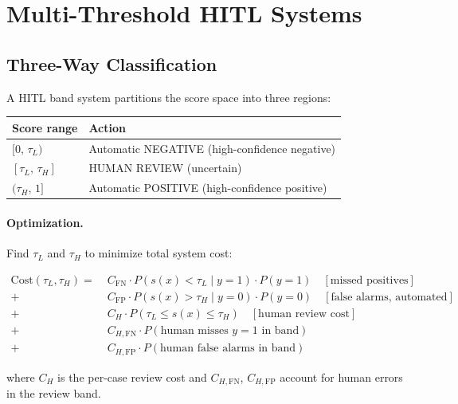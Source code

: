 \section{Multi-Threshold HITL Systems}

\subsection{Three-Way Classification}
\label{sec:three-way-classification}

A HITL band system partitions the score space into three regions:

\begin{center}
\begin{tabular}{@{}ll@{}}
\toprule
\textbf{Score range} & \textbf{Action} \\
\midrule
$[0,\, \tau_L)$ & Automatic NEGATIVE (high-confidence negative) \\
$[\tau_L,\, \tau_H]$ & HUMAN REVIEW (uncertain) \\
$(\tau_H,\, 1]$ & Automatic POSITIVE (high-confidence positive) \\
\bottomrule
\end{tabular}
\end{center}

\paragraph{Optimization.} Find $\tau_L$ and $\tau_H$ to minimize total system cost:

{\small
\begin{align*}
\mathrm{Cost}(\tau_L, \tau_H) = \;
  &C_{\mathrm{FN}} \cdot P\!\left(s(x) < \tau_L \mid y=1\right) \cdot P(y=1) \quad [\text{missed positives}] \\
+ &C_{\mathrm{FP}} \cdot P\!\left(s(x) > \tau_H \mid y=0\right) \cdot P(y=0) \quad [\text{false alarms, automated}] \\
+ &C_H \cdot P\!\left(\tau_L \leq s(x) \leq \tau_H\right) \quad [\text{human review cost}] \\
+ &C_{H,\mathrm{FN}} \cdot P\!\left(\text{human misses } y=1 \text{ in band}\right) \\
+ &C_{H,\mathrm{FP}} \cdot P\!\left(\text{human false alarms in band}\right)
\end{align*}}

where $C_H$ is the per-case review cost and $C_{H,\mathrm{FN}}$, $C_{H,\mathrm{FP}}$ account for human errors in the review band.

